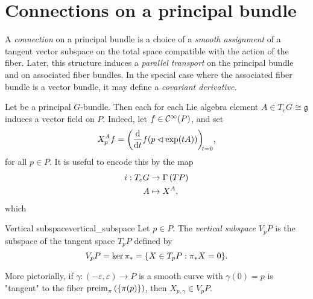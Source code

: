 \section{Connections on a principal bundle}
A \emph{connection} on a principal bundle is a choice of a \emph{smooth assignment} of a tangent vector subspace on the total space compatible with the action of the fiber. Later, this structure induces a \emph{parallel transport} on the principal bundle and on associated fiber bundles. In the special case where the associated fiber bundle is a vector bundle, it may define a \emph{covariant derivative.}

Let  be a principal \(G\)-bundle. Then each for each Lie algebra element \(A \in T_eG \cong \mathfrak{g}\) induces a vector field on \(P\). Indeed, let \(f \in \mathcal{C}^\infty(P)\), and set
\begin{equation*}
    X^A_p f = \diff*{f(p \ract \exp(tA))}{t}[t=0],
\end{equation*}
for all \(p \in P\). It is useful to encode this by the map
\begin{align*}
    i : T_eG &\to \Gamma\left(TP\right)\\
           A &\mapsto X^A,
\end{align*}
which 

\begin{definition}{Vertical subspace}{vertical_subspace}
    Let \(p \in P\). The \emph{vertical subspace} \(V_pP\) is the subspace of the tangent space \(T_pP\) defined by
    \begin{equation*}
        V_pP = \ker \pi_{{\ast}} = \{X \in T_pP : {\pi}_{\ast{}}{X} = 0\}.
    \end{equation*}
\end{definition}

More pictorially, if \(\gamma : (-\varepsilon, \varepsilon) \to P\) is a smooth curve with \(\gamma(0) = p\) is "tangent" to the fiber \(\operatorname{preim}_{\pi}{\left(\{\pi(p)\}\right)}\), then \(X_{p,\gamma} \in V_pP.\)

